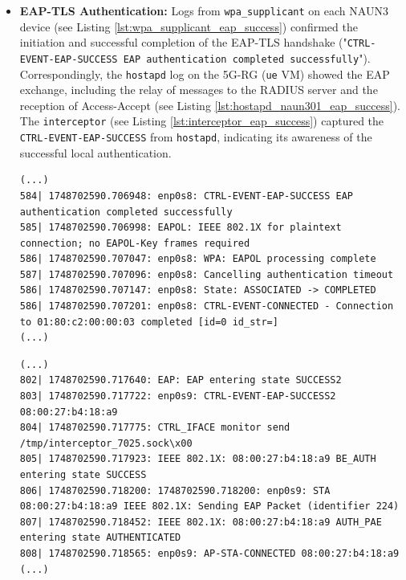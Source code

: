 \begin{itemize}
    \item \textbf{EAP-TLS Authentication:} Logs from \texttt{wpa\_supplicant} on each \ac{NAUN3} device (see Listing \ref{lst:wpa_supplicant_eap_success}) confirmed the initiation and successful completion of the \ac{EAP-TLS} handshake ("\texttt{CTRL-EVENT-EAP-SUCCESS EAP authentication completed successfully}"). Correspondingly, the \texttt{hostapd} log on the 5G-RG (\texttt{ue} \ac{VM}) showed the \ac{EAP} exchange, including the relay of messages to the \ac{RADIUS} server and the reception of Access-Accept (see Listing \ref{lst:hostapd_naun301_eap_success}). The \texttt{interceptor} (see Listing \ref{lst:interceptor_eap_success}) captured the \texttt{CTRL-EVENT-EAP-SUCCESS} from \texttt{hostapd}, indicating its awareness of the successful local authentication.

    \begin{lstlisting}[caption=wpa\_supplicant successful authentication,label={lst:wpa_supplicant_eap_success}]
(...)
584| 1748702590.706948: enp0s8: CTRL-EVENT-EAP-SUCCESS EAP authentication completed successfully
585| 1748702590.706998: EAPOL: IEEE 802.1X for plaintext connection; no EAPOL-Key frames required
586| 1748702590.707047: enp0s8: WPA: EAPOL processing complete
587| 1748702590.707096: enp0s8: Cancelling authentication timeout
586| 1748702590.707147: enp0s8: State: ASSOCIATED -> COMPLETED
586| 1748702590.707201: enp0s8: CTRL-EVENT-CONNECTED - Connection to 01:80:c2:00:00:03 completed [id=0 id_str=]
(...)
    \end{lstlisting}

    \begin{lstlisting}[caption=\texttt{hostapd} successful authentication,label={lst:hostapd_naun301_eap_success}]
(...)
802| 1748702590.717640: EAP: EAP entering state SUCCESS2
803| 1748702590.717722: enp0s9: CTRL-EVENT-EAP-SUCCESS2 08:00:27:b4:18:a9
804| 1748702590.717775: CTRL_IFACE monitor send /tmp/interceptor_7025.sock\x00
805| 1748702590.717923: IEEE 802.1X: 08:00:27:b4:18:a9 BE_AUTH entering state SUCCESS
806| 1748702590.718200: 1748702590.718200: enp0s9: STA 08:00:27:b4:18:a9 IEEE 802.1X: Sending EAP Packet (identifier 224)
807| 1748702590.718452: IEEE 802.1X: 08:00:27:b4:18:a9 AUTH_PAE entering state AUTHENTICATED
808| 1748702590.718565: enp0s9: AP-STA-CONNECTED 08:00:27:b4:18:a9
(...)
    \end{lstlisting}


\end{itemize}
